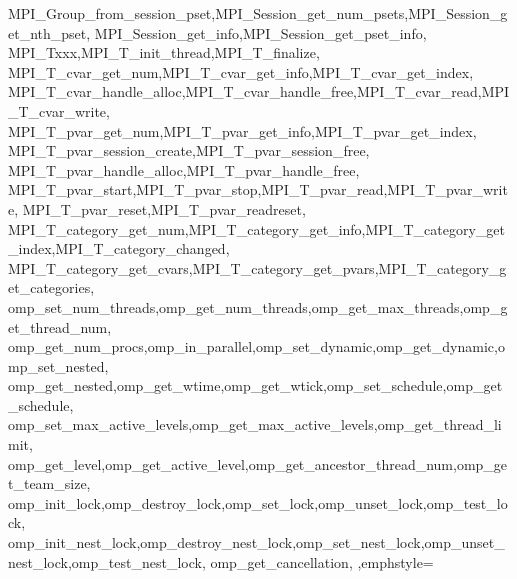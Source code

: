 {{{{{    MPI_Group_from_session_pset,MPI_Session_get_num_psets,MPI_Session_get_nth_pset,
    MPI_Session_get_info,MPI_Session_get_pset_info,
    MPI_Txxx,MPI_T_init_thread,MPI_T_finalize,
    MPI_T_cvar_get_num,MPI_T_cvar_get_info,MPI_T_cvar_get_index,
    MPI_T_cvar_handle_alloc,MPI_T_cvar_handle_free,MPI_T_cvar_read,MPI_T_cvar_write,
    MPI_T_pvar_get_num,MPI_T_pvar_get_info,MPI_T_pvar_get_index,
    MPI_T_pvar_session_create,MPI_T_pvar_session_free,
    MPI_T_pvar_handle_alloc,MPI_T_pvar_handle_free,
    MPI_T_pvar_start,MPI_T_pvar_stop,MPI_T_pvar_read,MPI_T_pvar_write,
    MPI_T_pvar_reset,MPI_T_pvar_readreset,
    MPI_T_category_get_num,MPI_T_category_get_info,MPI_T_category_get_index,MPI_T_category_changed,
    MPI_T_category_get_cvars,MPI_T_category_get_pvars,MPI_T_category_get_categories,
    omp_set_num_threads,omp_get_num_threads,omp_get_max_threads,omp_get_thread_num,
    omp_get_num_procs,omp_in_parallel,omp_set_dynamic,omp_get_dynamic,omp_set_nested,
    omp_get_nested,omp_get_wtime,omp_get_wtick,omp_set_schedule,omp_get_schedule,
    omp_set_max_active_levels,omp_get_max_active_levels,omp_get_thread_limit,
    omp_get_level,omp_get_active_level,omp_get_ancestor_thread_num,omp_get_team_size,
    omp_init_lock,omp_destroy_lock,omp_set_lock,omp_unset_lock,omp_test_lock,
    omp_init_nest_lock,omp_destroy_nest_lock,omp_set_nest_lock,omp_unset_nest_lock,omp_test_nest_lock,
    omp_get_cancellation,
  },emphstyle={\color{red!70!black}\bfseries}
}
}}}
